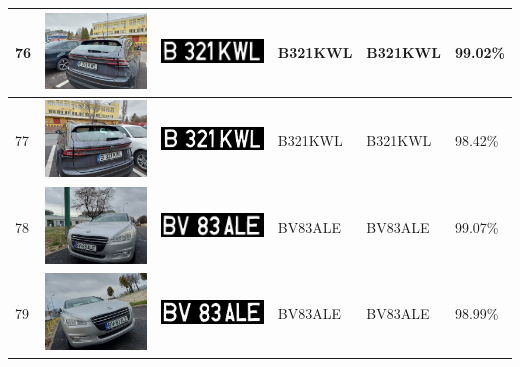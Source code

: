 \documentclass[a4paper,12pt]{report}
\begin{document}
\begin{longtable}{| m{0.6cm} | m{3cm} | m{3cm} | m{1.8cm} | m{1.8cm} | m{1.8cm} |}
    76  & \includegraphics[width=3cm,keepaspectratio]{dataset/43_d2.jpg}  & \includegraphics[width=3cm,keepaspectratio]{segmentari/76.jpg}  & B321KWL             & B321KWL              & 99.02\%    \\ \hline
    77  & \includegraphics[width=3cm,keepaspectratio]{dataset/43_s1.jpg}  & \includegraphics[width=3cm,keepaspectratio]{segmentari/77.jpg}  & B321KWL             & B321KWL              & 98.42\%    \\ \hline
    78  & \includegraphics[width=3cm,keepaspectratio]{dataset/44_d1.jpg}  & \includegraphics[width=3cm,keepaspectratio]{segmentari/78.jpg}  & BV83ALE             & BV83ALE              & 99.07\%    \\ \hline
    79  & \includegraphics[width=3cm,keepaspectratio]{dataset/44_s1.jpg}  & \includegraphics[width=3cm,keepaspectratio]{segmentari/79.jpg}  & BV83ALE             & BV83ALE              & 98.99\%    \\ \hline

\end{longtable}
\end{document}
